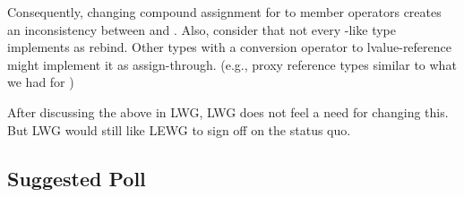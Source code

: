 Consequently, changing compound assignment for  to member operators creates an
inconsistency between  and .
Also, consider that not every -like type implements  as
rebind.
Other types with a conversion operator to lvalue-reference might implement it as assign-through.
(e.g., proxy reference types similar to what we had for )

After discussing the above in LWG, LWG does not feel a need for changing this.
But LWG would still like LEWG to sign off on the status quo.

\subsection{Suggested Poll}


